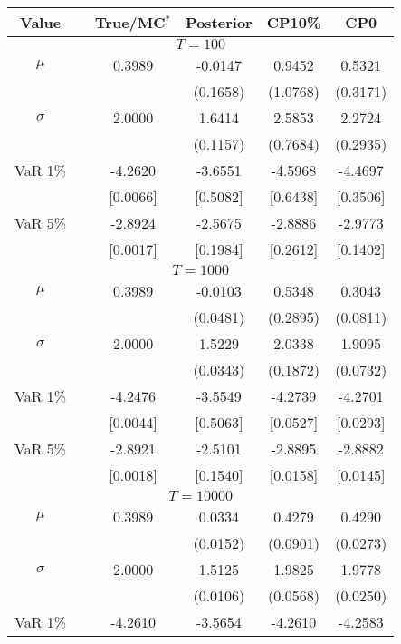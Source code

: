 { \renewcommand{\arraystretch}{1.2} 
\begin{table} 
\center 
\begin{tabular}{cc cccc} 
Value & & True/MC$^*$ & Posterior & CP10\% & CP0 \\ \hline 
\hline 
\multicolumn{6}{c}{$T =100$}  \\ 
\hline 
$\mu$&& 0.3989 & -0.0147 & 0.9452 & 0.5321  \\ 
&&   & (0.1658) & (1.0768) & (0.3171)  \\ 
$\sigma$&& 2.0000 & 1.6414 & 2.5853 & 2.2724  \\ 
&&   & (0.1157) & (0.7684) & (0.2935)  \\ 
VaR 1\% && -4.2620 & -3.6551 & -4.5968 & -4.4697  \\ 
  && [0.0066] & [0.5082] & [0.6438] & [0.3506]  \\ 
VaR 5\% && -2.8924 & -2.5675 & -2.8886 & -2.9773  \\ 
 && [0.0017] & [0.1984] & [0.2612] & [0.1402]  \\ 
\hline 
\multicolumn{6}{c}{$T =1000$}  \\ 
\hline 
$\mu$&& 0.3989 & -0.0103 & 0.5348 & 0.3043  \\ 
&&   & (0.0481) & (0.2895) & (0.0811)  \\ 
$\sigma$&& 2.0000 & 1.5229 & 2.0338 & 1.9095  \\ 
&&   & (0.0343) & (0.1872) & (0.0732)  \\ 
VaR 1\% && -4.2476 & -3.5549 & -4.2739 & -4.2701  \\ 
  && [0.0044] & [0.5063] & [0.0527] & [0.0293]  \\ 
VaR 5\% && -2.8921 & -2.5101 & -2.8895 & -2.8882  \\ 
 && [0.0018] & [0.1540] & [0.0158] & [0.0145]  \\ 
\hline 
\multicolumn{6}{c}{$T =10000$}  \\ 
\hline 
$\mu$&& 0.3989 & 0.0334 & 0.4279 & 0.4290  \\ 
&&   & (0.0152) & (0.0901) & (0.0273)  \\ 
$\sigma$&& 2.0000 & 1.5125 & 1.9825 & 1.9778  \\ 
&&   & (0.0106) & (0.0568) & (0.0250)  \\ 
VaR 1\% && -4.2610 & -3.5654 & -4.2610 & -4.2583  \\ 

\end{tabular}
\end{table}}
